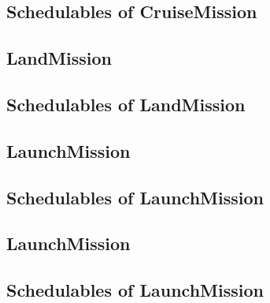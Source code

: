 \documentclass[10pt,a4paper]{article}
\begin{document}
\subsection{Schedulables of CruiseMission}


\newpage


\newpage


\newpage


\subsection{LandMission}

\newpage

\subsection{Schedulables of LandMission}


\newpage


\newpage


\newpage


\subsection{LaunchMission}

\newpage

\subsection{Schedulables of LaunchMission}


\newpage


\subsection{LaunchMission}

\newpage

\subsection{Schedulables of LaunchMission}


\newpage


\end{document}
